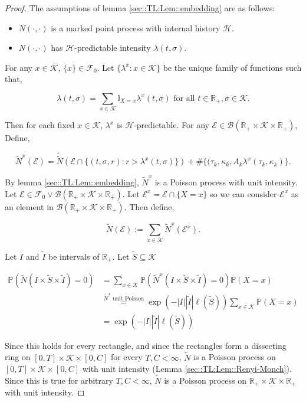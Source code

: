 \documentclass[12pt]{article}
\newcommand{\mb}{\mathbb}
\newcommand{\mc}{\mathcal}
\newcommand{\ms}{\mathscr}
\newcommand{\os}{\overset}
\newcommand{\te}{\text}
\newcommand{\pr}{\mb{P}}							%
\newcommand{\defeq}{:=}								%
\renewcommand{\S}{S}							%
\newcommand{\s}{\sigma}							%
\newcommand{\T}{T}								%
\newcommand{\x}{x}								%
\renewcommand{\t}{t}							%
\newcommand{\F}{\mc{F}}							%
\newcommand{\FH}{\mc{H}}						%
\newcommand{\X}{X}								%
\newcommand{\ts}[1]{_{#1}}						%
\newcommand{\const}{C}							%
\renewcommand{\SS}{\tilde{\S}}					%
\newcommand{\poiss}{N}							%
\newcommand{\Sm}{\ell}							%
\newcommand{\rate}{\lambda}						%
\renewcommand{\r}{r}							%
\newcommand{\alt}[1]{\widetilde{#1}}			%
\newcommand{\indx}[1]{_{#1}}					%
\newcommand{\pst}[1]{^{#1}}						%
\newcommand{\rt}{\tau}							%
\renewcommand{\it}{k}							%
\newcommand{\evnt}{\mc{E}}						%
\newcommand{\rv}{A}								%
\renewcommand{\mark}{\kappa}					%
\newcommand{\mspce}{\mc{K}}						%
\newcommand{\inte}{I}							%
\begin{document}
\begin{proof}
The assumptions of lemma \ref{sec::TL:Lem::embedding} are as follows:

\begin{itemize}
\item \(\poiss(\cdot,\cdot)\) is a marked point process with internal history \(\FH\).

\item \(\poiss(\cdot,\cdot)\) has \(\FH\)-predictable intensity \(\rate(\t,\s)\).
\end{itemize}

For any \(\x \in \mspce\), \(\{\x\} \in \F\ts{0}\). Let \(\{\rate\pst{\x}:\x \in \mspce\}\) be the unique family of functions such that,

\[\rate(\t,\s) = \sum_{\x \in \mspce} \mb{I}_{\X = \x}\rate\pst{\x}(\t,\s) \te{ for all } \t \in \mb{R}_+,\s \in \mspce.\]

Then for each fixed \(\x\in \mspce\), \(\rate\pst{\x}\) is \(\FH\)-predictable. For any \(\evnt \in \mc{B}(\mb{R}_+\times \mspce \times \mb{R}_+)\), Define,

\[\alt{\poiss}\pst{\x}(\evnt) = \alt{\alt{\poiss}}\left(\evnt\cap \{(\t,\s,\r) : \r > \rate\pst{\x}(\t,\s)\}\right) + \#\{(\rt\indx{\it},\mark\indx{\it},\rv\indx{\it}\rate\pst{\x}(\rt\indx{\it},\mark\indx{\it})\}.\]

By lemma \ref{sec::TL:Lem::embedding}, \(\alt{\poiss}\pst{\x}\) is a Poisson process with unit intensity. Let \(\evnt \in \F\ts{0}\vee\ms{B}(\mb{R}_+\times \mspce\times \mb{R}_+)\). Let \(\evnt\pst{\x} = \evnt\cap \{\X = \x\}\) so we can consider \(\evnt\pst{\x}\) as an element in \(\ms{B}(\mb{R}_+\times \mspce\times \mb{R}_+)\). Then define,

\[\alt{\poiss}(\evnt) \defeq \sum_{\x\in \mspce} \alt{\poiss}\pst{\x}(\evnt\pst{x}).\]

Let \(\inte\) and \(\alt{\inte}\) be intervals of \(\mb{R}_+\). Let \(\SS \subseteq \mspce\)

\begin{align*}
\pr\left(\alt{\poiss}(\inte\times \SS\times \alt{\inte}) = 0\right) &= \sum_{\x\in \mspce}\pr\left(\alt{\poiss}\pst{\x}(\inte\times \SS\times \alt{\inte}) = 0\right)\pr(\X = \x)\\
&\os{\alt{\poiss}\pst{\x}\te{ unit Poisson}}{=} \exp\left(-|\inte||\alt{\inte}|\Sm(\SS)\right)\sum_{\x\in \mspce}\pr(\X = \x)\\
&= \exp\left(-|\inte||\alt{\inte}|\Sm(\SS)\right)
\end{align*}

Since this holds for every rectangle, and since the rectangles form a dissecting ring on \([0,\T]\times \mspce \times [0,\const]\) for every \(\T,\const < \infty\), \(\alt{\poiss}\) is a Poisson process on \([0,\T]\times \mspce \times [0,\const]\) with unit intensity (Lemma \ref{sec::TL:Lem::Renyi-Monch}). Since this is true for arbitrary \(\T,\const < \infty\), \(\alt{\poiss}\) is a Poisson process on \(\mb{R}_+ \times \mspce \times \mb{R}_+\) with unit intensity.
\end{proof}
\end{document}
